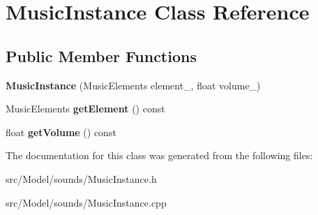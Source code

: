 \hypertarget{classMusicInstance}{}\section{Music\+Instance Class Reference}
\label{classMusicInstance}
\subsection*{Public Member Functions}
\begin{DoxyCompactItemize}
\item 
{\bfseries Music\+Instance} (Music\+Elements element\+\_\+, float volume\+\_\+)\hypertarget{classMusicInstance_a7e947fe32d6e6cfa0d8d16390ca68976}{}\label{classMusicInstance_a7e947fe32d6e6cfa0d8d16390ca68976}

\item 
Music\+Elements {\bfseries get\+Element} () const \hypertarget{classMusicInstance_a5d8c14249eaaa6df4e6283e07c412baa}{}\label{classMusicInstance_a5d8c14249eaaa6df4e6283e07c412baa}

\item 
float {\bfseries get\+Volume} () const \hypertarget{classMusicInstance_a90772b2c1861f15588d14e8cc2f21946}{}\label{classMusicInstance_a90772b2c1861f15588d14e8cc2f21946}

\end{DoxyCompactItemize}


The documentation for this class was generated from the following files\+:\begin{DoxyCompactItemize}
\item 
src/\+Model/sounds/Music\+Instance.\+h\item 
src/\+Model/sounds/Music\+Instance.\+cpp\end{DoxyCompactItemize}
